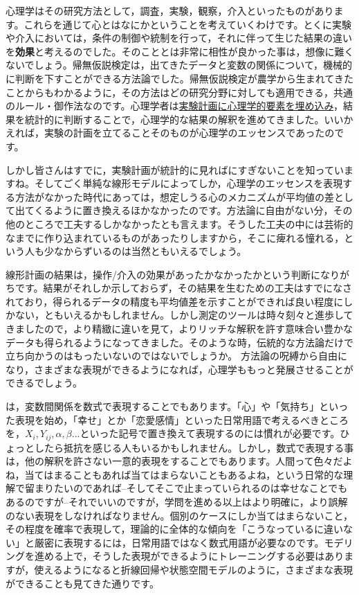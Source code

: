 \documentclass{ltjsbook}
\begin{document}
心理学はその研究方法として，調査，実験，観察，介入といったものがあります。これらを通じて心とはなにかということを考えていくわけです。とくに実験や介入においては，条件の制御や統制を行って，それに伴って生じた結果の違いを\textbf{効果}と考えるのでした。そのこととは非常に相性が良かった事は，想像に難くないでしょう。帰無仮説検定は，出てきたデータと変数の関係について，機械的に判断を下すことができる方法論でした。帰無仮説検定が農学から生まれてきたことからもわかるように，その方法はどの研究分野に対しても適用できる，共通のルール・御作法なのです。心理学者は\underline{実験計画に心理学的要素を埋め込み}，結果を統計的に判断することで，心理学的な結果の解釈を進めてきました。いいかえれば，実験の計画を立てることそのものが心理学のエッセンスであったのです。

しかし皆さんはすでに，実験計画が統計的に見ればにすぎないことを知っていますね。そしてごく単純な線形モデルによってしか，心理学のエッセンスを表現する方法がなかった時代にあっては，想定しうる心のメカニズムが平均値の差として出てくるように置き換えるほかなかったのです。方法論に自由がない分，その他のところで工夫するしかなかったとも言えます。そうした工夫の中には芸術的なまでに作り込まれているものがあったりしますから，そこに痺れる憧れる，という人も少なからずいるのは当然ともいえるでしょう。

線形計画の結果は，操作/介入の効果があったかなかったかという判断になりがちです。結果がそれしか示しておらず，その結果を生むための工夫はすでになされており，得られるデータの精度も平均値差を示すことができれば良い程度にしかない，ともいえるかもしれません。しかし測定のツールは時々刻々と進歩してきましたので，より精緻に違いを見て，よりリッチな解釈を許す意味合い豊かなデータも得られるようになってきました。そのような時，伝統的な方法論だけで立ち向かうのはもったいないのではないでしょうか。
方法論の呪縛から自由になり，さまざまな表現ができるようになれば，心理学ももっと発展させることができるでしょう。

は，変数間関係を数式で表現することでもあります。「心」や「気持ち」といった表現を始め，「幸せ」とか「恋愛感情」といった日常用語で考えるべきところを，$X_i,Y_{ij},\alpha,\beta...$といった記号で置き換えて表現するのには慣れが必要です。ひょっとしたら抵抗を感じる人もいるかもしれません。しかし，数式で表現する事は，他の解釈を許さない一意的表現をすることでもあります。人間って色々だよね，当てはまることもあれば当てはまらないこともあるよね，という日常的な理解で留まりたいのであれば--そしてそこで止まっていられるのは幸せなことでもあるのですが--それでいいのですが，学問を進める以上はより明確に，より誤解のない表現をしなければなりません。個別のケースにしか当てはまらないこと，その程度を確率で表現して，理論的に全体的な傾向を「こうなっているに違いない」と厳密に表現するには，日常用語ではなく数式用語が必要なのです。モデリングを進める上で，そうした表現ができるようにトレーニングする必要はありますが，使えるようになると折線回帰や状態空間モデルのように，さまざまな表現ができることも見てきた通りです。
\end{document}
